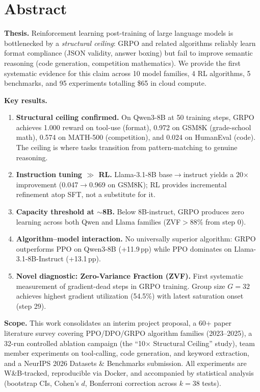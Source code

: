 \documentclass[12pt,a4paper]{report}
\theoremstyle{definition}
\begin{document}

\chapter*{Abstract}

\textbf{Thesis.} Reinforcement learning post-training of large language models is bottlenecked by a \emph{structural ceiling}: GRPO and related algorithms reliably learn format compliance (JSON validity, answer boxing) but fail to improve semantic reasoning (code generation, competition mathematics). We provide the first systematic evidence for this claim across 10 model families, 4 RL algorithms, 5 benchmarks, and 95 experiments totalling \$65 in cloud compute.

\textbf{Key results.}
\begin{enumerate}[nosep]
    \item \textbf{Structural ceiling confirmed.} On Qwen3-8B at 50 training steps, GRPO achieves 1.000 reward on tool-use (format), 0.972 on GSM8K (grade-school math), 0.574 on MATH-500 (competition), and 0.024 on HumanEval (code). The ceiling is where tasks transition from pattern-matching to genuine reasoning.
    \item \textbf{Instruction tuning $\gg$ RL.} Llama-3.1-8B base$\to$instruct yields a 20$\times$ improvement (0.047$\to$0.969 on GSM8K); RL provides incremental refinement atop SFT, not a substitute for it.
    \item \textbf{Capacity threshold at $\sim$8B.} Below 8B-instruct, GRPO produces zero learning across both Qwen and Llama families (ZVF$>$88\% from step 0).
    \item \textbf{Algorithm--model interaction.} No universally superior algorithm: GRPO outperforms PPO on Qwen3-8B (+11.9\,pp) while PPO dominates on Llama-3.1-8B-Instruct (+13.1\,pp).
    \item \textbf{Novel diagnostic: Zero-Variance Fraction (ZVF).} First systematic measurement of gradient-dead steps in GRPO training. Group size $G\!=\!32$ achieves highest gradient utilization (54.5\%) with latest saturation onset (step 29).
\end{enumerate}

\textbf{Scope.} This work consolidates an interim project proposal, a 60+ paper literature survey covering PPO/DPO/GRPO algorithm families (2023--2025), a 32-run controlled ablation campaign (the ``10$\times$ Structural Ceiling'' study), team member experiments on tool-calling, code generation, and keyword extraction, and a NeurIPS 2026 Datasets \& Benchmarks submission. All experiments are W\&B-tracked, reproducible via Docker, and accompanied by statistical analysis (bootstrap CIs, Cohen's $d$, Bonferroni correction across $k\!=\!38$ tests).
\end{document}

